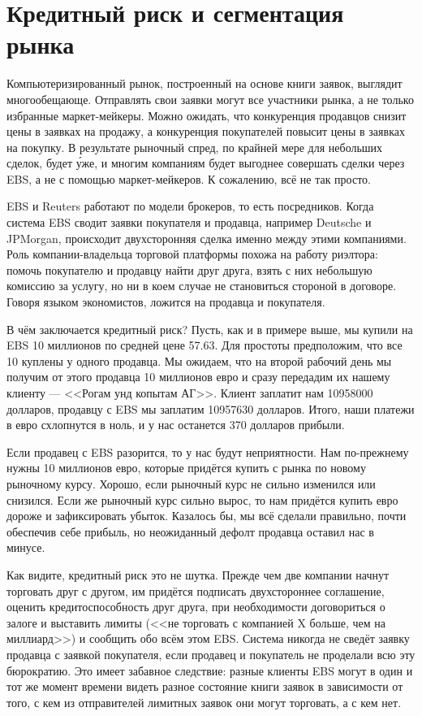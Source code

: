 \section*{Кредитный риск и сегментация рынка}

Компьютеризированный рынок, построенный на основе книги заявок, выглядит
многообещающе. Отправлять свои заявки могут все участники рынка, а не только
избранные маркет-мейкеры. Можно ожидать, что конкуренция продавцов снизит цены в
заявках на продажу, а конкуренция покупателей повысит цены в заявках на покупку.
В результате рыночный спред, по крайней мере для небольших сделок, будет
\'{у}же, и многим компаниям будет выгоднее совершать сделки через EBS, а не с
помощью маркет-мейкеров. К сожалению, всё не так просто.

EBS и Reuters работают по модели брокеров, то есть посредников. Когда система
EBS сводит заявки покупателя и продавца, например Deutsche и JPMorgan,
происходит двухсторонняя сделка именно между этими компаниями. Роль
компании-владельца торговой платформы похожа на работу риэлтора: помочь
покупателю и продавцу найти друг друга, взять с них небольшую комиссию за
услугу, но ни в коем случае не становиться стороной в договоре. Говоря языком
экономистов,  ложится на продавца и
покупателя.

В чём заключается кредитный риск? Пусть, как и в примере выше, мы купили на EBS
10 миллионов по средней цене \num{57.63}. Для простоты предположим, что все 10
куплены у одного продавца. Мы ожидаем, что на второй рабочий день мы получим от
этого продавца 10 миллионов евро и сразу передадим их нашему клиенту --- <<Рогам
унд копытам АГ>>. Клиент заплатит нам \num{10 958 000} долларов, продавцу с EBS
мы заплатим \num{10 957 630} долларов. Итого, наши платежи в евро схлопнутся в
ноль, и у нас останется 370 долларов прибыли.

Если продавец с EBS разорится, то у нас будут неприятности. Нам по-прежнему
нужны 10 миллионов евро, которые придётся купить с рынка по новому рыночному
курсу. Хорошо, если рыночный курс не сильно изменился или снизился. Если же
рыночный курс сильно вырос, то нам придётся купить евро дороже
 и зафиксировать убыток. Казалось бы, мы всё сделали
правильно, почти обеспечив себе прибыль, но неожиданный дефолт продавца оставил
нас в минусе.

Как видите, кредитный риск это не шутка. Прежде чем две компании начнут
торговать друг с другом, им придётся подписать двухстороннее соглашение, оценить
кредитоспособность друг друга, при необходимости договориться о залоге и
выставить лимиты (<<не торговать с компанией X больше, чем на миллиард>>) и
сообщить обо всём этом EBS. Система никогда не сведёт заявку продавца с заявкой
покупателя, если продавец и покупатель не проделали всю эту бюрократию. Это
имеет забавное следствие: разные клиенты EBS могут в один и тот же момент
времени видеть разное состояние книги заявок в зависимости от того, с кем из
отправителей лимитных заявок они могут торговать, а с кем нет.

